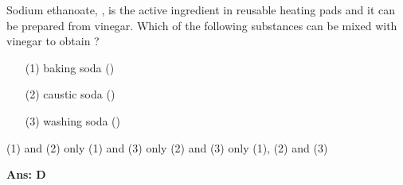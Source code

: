\documentclass[border=3pt,varwidth=70mm]{standalone}
\begin{document}
 
Sodium ethanoate, , is the active ingredient in reusable heating pads and it can be prepared from vinegar. Which of the following substances can be mixed with vinegar to obtain ? 

\begin{itemize}
\item[(1)] baking soda ()
\item[(2)] caustic soda ()
\item[(3)] washing soda ()
\end{itemize}

\begin{choices}
\choice (1) and (2) only
\choice (1) and (3) only
\choice (2) and (3) only
\choice (1), (2) and (3)
\end{choices}

\begin{answer}
\hrulefill\par
\textbf{Ans: D}

\end{answer}
\end{document}
